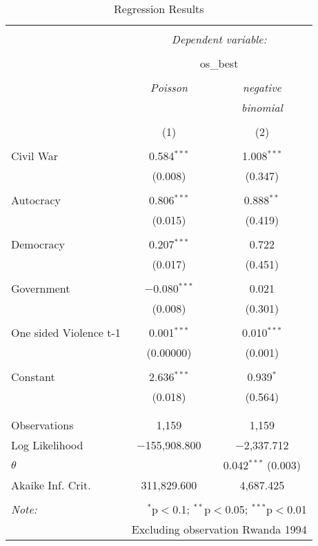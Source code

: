
\begin{table}[!htbp] \centering 
  \caption{Regression Results} 
  \label{} 
\begin{tabular}{@{\extracolsep{5pt}}lcc} 
\\[-1.8ex]\hline 
\hline \\[-1.8ex] 
 & \multicolumn{2}{c}{\textit{Dependent variable:}} \\ 
\cline{2-3} 
\\[-1.8ex] & \multicolumn{2}{c}{os\_best} \\ 
\\[-1.8ex] & \textit{Poisson} & \textit{negative} \\ 
 & \textit{} & \textit{binomial} \\ 
\\[-1.8ex] & (1) & (2)\\ 
\hline \\[-1.8ex] 
 Civil War & 0.584$^{***}$ & 1.008$^{***}$ \\ 
  & (0.008) & (0.347) \\ 
  & & \\ 
 Autocracy & 0.806$^{***}$ & 0.888$^{**}$ \\ 
  & (0.015) & (0.419) \\ 
  & & \\ 
 Democracy & 0.207$^{***}$ & 0.722 \\ 
  & (0.017) & (0.451) \\ 
  & & \\ 
 Government & $-$0.080$^{***}$ & 0.021 \\ 
  & (0.008) & (0.301) \\ 
  & & \\ 
 One sided Violence t-1 & 0.001$^{***}$ & 0.010$^{***}$ \\ 
  & (0.00000) & (0.001) \\ 
  & & \\ 
 Constant & 2.636$^{***}$ & 0.939$^{*}$ \\ 
  & (0.018) & (0.564) \\ 
  & & \\ 
\hline \\[-1.8ex] 
Observations & 1,159 & 1,159 \\ 
Log Likelihood & $-$155,908.800 & $-$2,337.712 \\ 
$\theta$ &  & 0.042$^{***}$  (0.003) \\ 
Akaike Inf. Crit. & 311,829.600 & 4,687.425 \\ 
\hline 
\hline \\[-1.8ex] 
\textit{Note:}  & \multicolumn{2}{r}{$^{*}$p$<$0.1; $^{**}$p$<$0.05; $^{***}$p$<$0.01} \\ 
 & \multicolumn{2}{r}{Excluding observation  Rwanda 1994} \\ 
\end{tabular} 
\end{table} 
